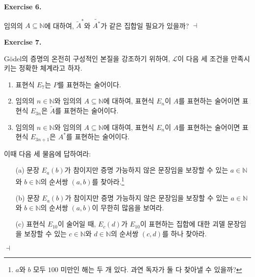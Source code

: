 \documentclass[12pt]{paper}
\newenvironment{context}[1][]
{ \noindent \textbf{{#1}.}
}
{ \hfill $ \dashv $
}
\begin{document}
  \begin{context}[Exercise 6]
    임의의 $A \subseteq \mathbb{N}$에 대하여,
    $\tilde{A}^{*}$와 $\widetilde{A^{*}}$가 같은 집합일 필요가 있을까?
  \end{context}

  \begin{context}[Exercise 7]
    G\"odel의 증명의 온전히 구성적인 본질을 강조하기 위하여,
    $\mathcal{L}$이 다음 세 조건을 만족시키는 정확한 체계라고 하자.
    \begin{enumerate}
      \item 표현식 $E_{7}$는 $P$를 표현하는 술어이다.
      \item 임의의 $n \in \mathbb{N}$와 임의의 $A \subseteq \mathbb{N}$에 대하여, 표현식 $E_{n}$이 $A$를 표현하는 술어이면 표현식 $E_{3 n}$은 $\tilde{A}$를 표현하는 술어이다.
      \item 임의의 $n \in \mathbb{N}$와 임의의 $A \subseteq \mathbb{N}$에 대하여, 표현식 $E_{n}$이 $A$를 표현하는 술어이면 표현식 $E_{3 n + 1}$은 $A^{*}$를 표현하는 술어이다.
    \end{enumerate}
    
    이때 다음 세 물음에 답하여라:
    \begin{itemize}
      \item[(a)] 문장 $E_{a} \left( b \right)$가 참이지만 증명 가능하지 않은 문장임을 보장할 수 있는 $a \in \mathbb{N}$와 $b \in \mathbb{N}$의 순서쌍 $\left( a , b \right)$를 찾아라.\footnote
      {
        $a$와 $b$ 모두 $100$ 미만인 해는 두 개 있다.
        과연 독자가 둘 다 찾아낼 수 있을까?
      }
      \item[(b)] 문장 $E_{a} \left( b \right)$가 참이지만 증명 가능하지 않은 문장임을 보장할 수 있는 $a \in \mathbb{N}$와 $b \in \mathbb{N}$의 순서쌍 $\left( a , b \right)$이 무한히 많음을 보여라.
      \item[(c)] 표현식 $E_{10}$이 술어일 때, $E_{c} \left( d \right)$가 $E_{10}$이 표현하는 집합에 대한 괴델 문장임을 보장할 수 있는 $c \in \mathbb{N}$와 $d \in \mathbb{N}$의 순서쌍 $\left( c , d \right)$를 하나 찾아라.
    \end{itemize}
  \end{context}
\end{document}
